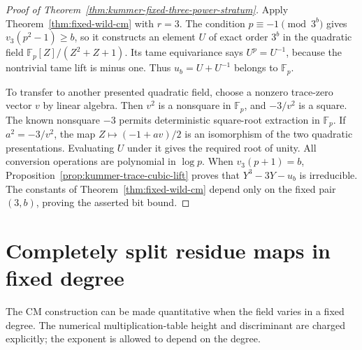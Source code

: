 \documentclass[11pt]{article}
\theoremstyle{definition}
\theoremstyle{remark}
\begin{document}
\begin{proof}[Proof of Theorem~\ref{thm:kummer-fixed-three-power-stratum}]
Apply Theorem~\ref{thm:fixed-wild-cm} with \(r=3\).
The condition \(p\equiv-1\pmod{3^b}\) gives
\(v_3(p^2-1)\geq b\), so it constructs an element \(U\) of
exact order \(3^b\) in the quadratic field
\(\mathbb F_p[Z]/(Z^2+Z+1)\). Its tame equivariance says
\(U^p=U^{-1}\), because the nontrivial tame lift is minus one.
Thus \(u_b=U+U^{-1}\) belongs to \(\mathbb F_p\).

To transfer to another presented quadratic field, choose a nonzero
trace-zero vector \(v\) by linear algebra. Then \(v^2\) is a
nonsquare in \(\mathbb F_p\), and \(-3/v^2\) is a square.
The known nonsquare \(-3\) permits deterministic square-root
extraction in \(\mathbb F_p\). If \(a^2=-3/v^2\), the map
\(Z\mapsto(-1+av)/2\) is an isomorphism of the two quadratic
presentations. Evaluating \(U\) under it gives the required root
of unity. All conversion operations are polynomial in \(\log p\).
When \(v_3(p+1)=b\), Proposition~\ref{prop:kummer-trace-cubic-lift}
proves that \(Y^3-3Y-u_b\) is irreducible. The constants of
Theorem~\ref{thm:fixed-wild-cm} depend only on the fixed pair
\((3,b)\), proving the asserted bit bound.
\end{proof}

\section{Completely split residue maps in fixed degree}
\label{sec:general-real-residue}
The CM construction can be made quantitative when the field varies in a
fixed degree.  The numerical multiplication-table height and discriminant
are charged explicitly; the exponent is allowed to depend on the degree.
\end{document}
